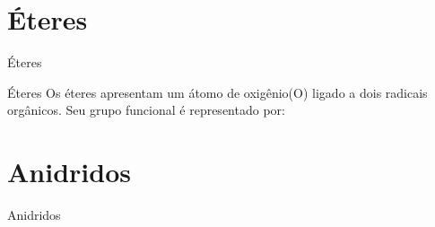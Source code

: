 \documentclass[presentation,professionalfonts,aspectratio=169]{beamer}
\begin{document}
\section{Éteres}
\label{sec:org4eef757}

\begin{frame}[label={sec:orged12840}]{Éteres}
\begin{mybox}{Éteres}
Os éteres apresentam um átomo de oxigênio(O) ligado a dois radicais orgânicos.
Seu grupo funcional é representado por:

\begin{center}
\end{center}

\end{mybox}
\end{frame}





\section{Anidridos}
\label{sec:org4b453ef}

\begin{frame}[label={sec:org19021f9}]{Anidridos}
\end{frame}
\end{document}

